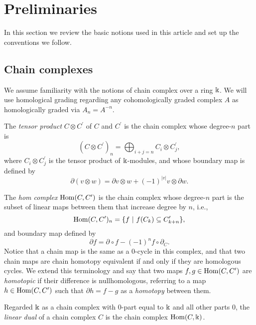 
\section{Preliminaries} \label{s:preliminaries}

In this section we review the basic notions used in this article and set up the conventions we follow.

\subsection{Chain complexes}

We assume familiarity with the notions of chain complex over a ring $\Bbbk$. We will use homological grading regarding any cohomologically graded complex $A$ as homologically graded via $A_n = A^{-n}$.

The \textit{tensor product} $C \otimes C^\prime$ of $C$ and $C^\prime$ is the chain complex whose degree-$n$ part is
\begin{equation*}
\left(C \otimes C^\prime\right)_n = \bigoplus_{i+j=n} C_i \otimes C^\prime_j,
\end{equation*}
where $C_i \otimes C^\prime_j$ is the tensor product of $\Bbbk$-modules, and whose boundary map is defined by
\begin{equation*}
\partial (v \otimes w) = \partial v \otimes w + (-1)^{|v|} v \otimes \partial w.
\end{equation*}

The \textit{hom complex} $\mathrm{Hom}(C, C^\prime)$ is the chain complex whose degree-$n$ part is the subset of linear maps between them that increase degree by $n$, i.e.,
\begin{equation*}
\mathrm{Hom}(C, C^\prime)_n = \{f \ |\ f(C_k) \subseteq C^\prime_{k+n}\},
\end{equation*}
and boundary map defined by
\begin{equation*}
\partial f = \partial_{ } \circ f - (-1)^{n} f \circ \partial_C.
\end{equation*} 
Notice that a chain map is the same as a $0$-cycle in this complex, and that two chain maps are chain homotopy equivalent if and only if they are homologous cycles. We extend this terminology and say that two maps $f, g \in \mathrm{Hom}(C, C^\prime)$ are \textit{homotopic} if their difference is nullhomologous, referring to a map $h \in \mathrm{Hom}(C, C^\prime)$ such that $\partial h = f - g$ as a \textit{homotopy} between them.

Regarded $\Bbbk$ as a chain complex with $0$-part equal to $\Bbbk$ and all other parts $0$, the \textit{linear dual} of a chain complex $C$ is the chain complex $\mathrm{Hom}(C, \Bbbk)$.

